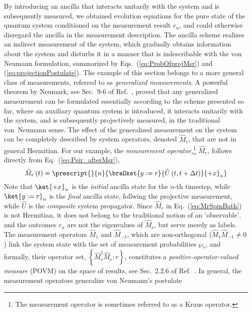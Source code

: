 By introducing an ancilla that interacts unitarily with the system
and is subsequently measured, we obtained evolution equations for
the pure state of the quantum system conditioned on the measurement
result $r_{n}$, and could otherwise disregard the ancilla in the
measurement description. The ancilla scheme realizes an indirect measurement
of the system, which gradually obtains information about the system
and disturbs it in a manner that is indescribable with the von Neumann
formulation, summarized by Eqs.~(\ref{eq:ProbOfprojMsr}) and (\ref{eq:projectionPostulate}).
The example of this section belongs to a more general class of measurements,
referred to as \emph{generalized measurements}. A powerful theorem
by Neumark, see Sec.~9-6 of Ref.~\citet{PeresBook}, proved that
any generalized measurement can be formulated essentially according
to the scheme presented so far, where an auxiliary quantum system
is introduced, it interacts unitarily with the system, and is subsequently
projectively measured, in the traditional von~Neumann sense. The
effect of the generalized measurement on the system can be completely
described by system operators, denoted $\hat{M}_{r}$, that are not
in general Hermitian. For our example, the \emph{measurement operator,}\footnote{The measurement operator is sometimes referred to as a Kraus operator.}\emph{
$\hat{M}_{r}$,} follows directly from Eq.~(\ref{eq:Psir_afterMsr}),
\begin{equation}
\hat{M}_{r}\left(t\right)=\prescript{}{n}{\braOket{y:=r}{\hat{U}\left(t,t+\Delta t\right)}{+x}_{n}}\label{eq:MrSpinBath}
\end{equation}
Note that $\ket{+x}_{n}$ is the \emph{initial} ancilla state for
the $n$-th timestep, while $\ket{y:=r}_{n}$ is the \emph{final}
ancilla state, follwing the projective measurement, while $\hat{U}$
is the \emph{composite} system propagator. Since $\hat{M}_{r}$ in
Eq.~(\ref{eq:MrSpinBath}) is not\emph{ }Hermitian, it does not belong
to the traditional notion of an 'observable', and the outcomes $r_{n}$
are not the eigenvalues of $\hat{M}_{r}$, but serve merely as labels.
The measurement operators $\hat{M}_{1}$ and $\hat{M}_{-1}$, which
are non-orthogonal ($\hat{M}_{1}\hat{M}_{-1}\neq0$) link the system
state with the set of measurement probabilities $\wp_{r}$, and formally,
their operator set, $\left\{ \hat{M}_{r}^{\dagger}\hat{M}_{r}:r\right\} $,
constitutes a \emph{positive-operator-valued measure} (POVM) on the
space of results, see Sec.~2.2.6 of Ref.~\citet{NielsenChuangBook}.
In general, the measurement operators generalize von Neumann's postulate
